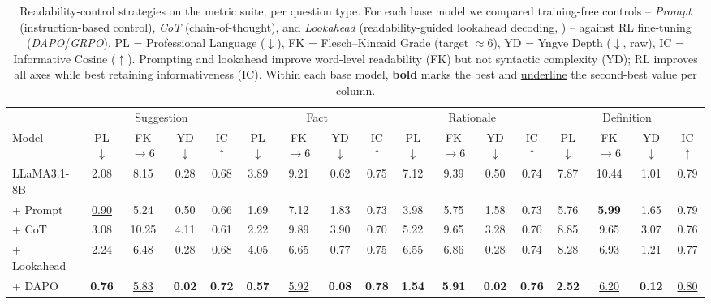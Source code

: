 \begin{table}[t]
\centering
\caption{Readability-control strategies on the \repqa{} metric suite, per question type. For each base model we compared training-free controls -- \emph{Prompt} (instruction-based control), \emph{CoT} (chain-of-thought), and \emph{Lookahead} (readability-guided lookahead decoding, \citealp{ribeiro-etal-2023-generating}) -- against RL fine-tuning (\emph{DAPO}/\emph{GRPO}). PL = Professional Language ($\downarrow$), FK = Flesch--Kincaid Grade (target $\approx 6$), YD = Yngve Depth ($\downarrow$, raw), IC = Informative Cosine ($\uparrow$). Prompting and lookahead improve word-level readability (FK) but not syntactic complexity (YD); RL improves all axes while best retaining informativeness (IC). Within each base model, \textbf{bold} marks the best and \underline{underline} the second-best value per column.}
\label{tab:post}
\tiny
\setlength{\tabcolsep}{3pt}
\begin{tabular}{l cccc cccc cccc cccc}
\toprule
 & \multicolumn{4}{c}{Suggestion} & \multicolumn{4}{c}{Fact} & \multicolumn{4}{c}{Rationale} & \multicolumn{4}{c}{Definition} \\
\cmidrule(lr){2-5} \cmidrule(lr){6-9} \cmidrule(lr){10-13} \cmidrule(lr){14-17}
Model & PL$\downarrow$ & FK$\rightarrow6$ & YD$\downarrow$ & IC$\uparrow$ & PL$\downarrow$ & FK$\rightarrow6$ & YD$\downarrow$ & IC$\uparrow$ & PL$\downarrow$ & FK$\rightarrow6$ & YD$\downarrow$ & IC$\uparrow$ & PL$\downarrow$ & FK$\rightarrow6$ & YD$\downarrow$ & IC$\uparrow$ \\
\midrule
LLaMA3.1-8B & 2.08 & 8.15 & 0.28 & 0.68 & 3.89 & 9.21 & 0.62 & 0.75 & 7.12 & 9.39 & 0.50 & 0.74 & 7.87 & 10.44 & 1.01 & 0.79 \\
\scriptsize + Prompt & \underline{0.90} & 5.24 & 0.50 & 0.66 & 1.69 & 7.12 & 1.83 & 0.73 & 3.98 & 5.75 & 1.58 & 0.73 & 5.76 & \textbf{5.99} & 1.65 & 0.79 \\
\scriptsize + CoT & 3.08 & 10.25 & 4.11 & 0.61 & 2.22 & 9.89 & 3.90 & 0.70 & 5.22 & 9.65 & 3.28 & 0.70 & 8.85 & 9.65 & 3.07 & 0.76 \\
\scriptsize + Lookahead & 2.24 & 6.48 & 0.28 & 0.68 & 4.05 & 6.65 & 0.77 & 0.75 & 6.55 & 6.86 & 0.28 & 0.74 & 8.28 & 6.93 & 1.21 & 0.77 \\
\scriptsize + DAPO & \textbf{0.76} & \underline{5.83} & \textbf{0.02} & \textbf{0.72} & \textbf{0.57} & \underline{5.92} & \textbf{0.08} & \textbf{0.78} & \textbf{1.54} & \textbf{5.91} & \textbf{0.02} & \textbf{0.76} & \textbf{2.52} & \underline{6.20} & \textbf{0.12} & \underline{0.80} \\

\end{tabular}
\end{table}
